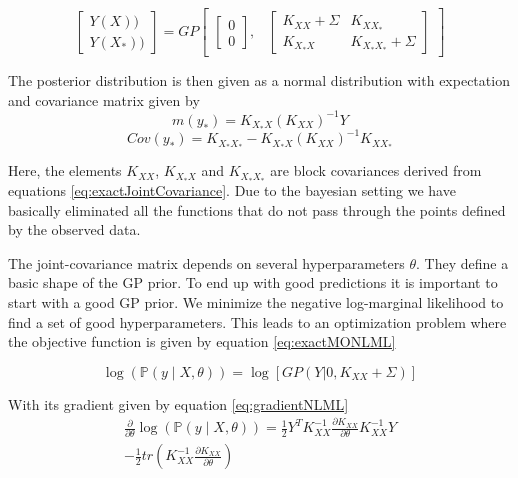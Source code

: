  \begin{equation}\label{eq:MOGPPrior}
 \begin{bmatrix}
   Y(X))\\ 
   Y(X_{*}))
   \end{bmatrix} = GP\begin{bmatrix}
   \begin{bmatrix}
   0\\ 
   0
   \end{bmatrix}, 
   & 
   \begin{bmatrix}
   K_{XX} + \Sigma & K_{XX_{*}}\\ 
   K_{X_{*}X} & K_{X_{*}X_{*}} + \Sigma
   \end{bmatrix} 

   \end{bmatrix} 
 \end{equation}

  
  The posterior distribution is then given as a normal distribution with expectation and covariance matrix given by \cite{Rasmussen2005}
  \begin{equation}\label{eq:predictiveMOMean}
  m(y_{*}) = K_{X_{*}X}\left ( K_{XX} \right )^{-1}Y
  \end{equation}
  \begin{equation}\label{eq:predictiveMOCovariance}
  Cov(y_{*}) = K_{X_{*}X_{*}} - K_{X_{*}X}\left ( K_{XX} \right )^{-1}K_{XX_{*}}
  \end{equation}
  
  Here, the elements \(K_{XX}\), \(K_{X_{*}X}\) and \(K_{X_{*}X_{*}}\) are block covariances derived from equations \ref{eq:exactJointCovariance}. Due to the bayesian setting we have basically eliminated all the functions that do not pass through the points defined by the observed data.
  
  The joint-covariance matrix depends on several hyperparameters \(\theta\). They define a basic shape of the GP prior. To end up with good predictions it is important to start with a good GP prior. We minimize the negative log-marginal likelihood to find a set of good hyperparameters. This leads to an optimization problem where the objective function is given by equation \ref{eq:exactMONLML} 
  
  \begin{equation}\label{eq:exactMONLML}
\log(\mathbb{P}(y\mid X, \theta )) = \log[GP(Y| 0, K_{XX} + \Sigma )]
  \end{equation}
  
  With its gradient given by equation \ref{eq:gradientNLML}
  \begin{multline}\label{eq:gradientNLML}
 \frac{\partial }{\partial \theta}\log(\mathbb{P}(y\mid X, \theta )) = 
\frac{1}{2}Y^{T}K_{XX}^{-1}\frac{\partial K_{XX}}{\partial \theta}K_{XX}^{-1}Y \\
- \frac{1}{2}tr(K_{XX}^{-1}\frac{\partial K_{XX}}{\partial \theta})  
  \end{multline}

